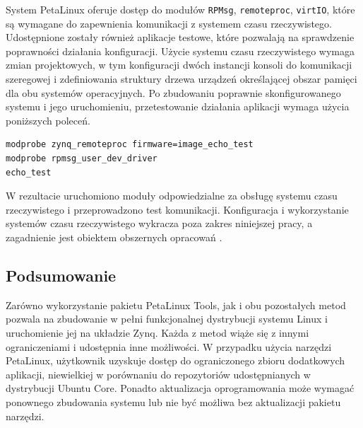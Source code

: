 System PetaLinux oferuje dostęp do modułów \texttt{RPMsg}, \texttt{remoteproc}, \texttt{virtIO}, które są wymagane do zapewnienia komunikacji z systemem czasu rzeczywistego. 
Udostępnione zostały również aplikacje testowe, które pozwalają na sprawdzenie poprawności działania konfiguracji.
Użycie systemu czasu rzeczywistego wymaga zmian projektowych, w tym konfiguracji dwóch instancji konsoli do komunikacji szeregowej i zdefiniowania struktury drzewa urządzeń określającej obszar pamięci dla obu systemów operacyjnych. 
Po zbudowaniu poprawnie skonfigurowanego systemu i jego uruchomieniu, przetestowanie działania aplikacji wymaga użycia poniższych poleceń.

\begin{lstlisting}[breaklines=true]
modprobe zynq_remoteproc firmware=image_echo_test
modprobe rpmsg_user_dev_driver
echo_test
\end{lstlisting}

W rezultacie uruchomiono moduły odpowiedzialne za obsługę systemu czasu rzeczywistego i przeprowadzono test komunikacji.
Konfiguracja i wykorzystanie systemów czasu rzeczywistego wykracza poza zakres niniejszej pracy, a zagadnienie jest obiektem obszernych opracowań \cite{adam-taylor-openamp,zynq-openamp-gsg}.


\subsection*{Podsumowanie} 

Zarówno wykorzystanie pakietu PetaLinux Tools, jak i obu pozostałych metod pozwala na zbudowanie w pełni funkcjonalnej dystrybucji systemu Linux i uruchomienie jej na układzie Zynq.
Każda z metod wiąże się z innymi ograniczeniami i udostępnia inne możliwości. 
W przypadku użycia narzędzi PetaLinux, użytkownik uzyskuje dostęp do ograniczonego zbioru dodatkowych aplikacji, niewielkiej w porównaniu do repozytoriów udostępnianych w dystrybucji Ubuntu Core. 
Ponadto aktualizacja oprogramowania może wymagać ponownego zbudowania systemu lub nie być możliwa bez aktualizacji pakietu narzędzi. 

